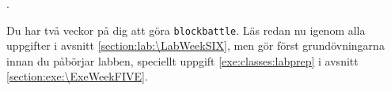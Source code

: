 

\Lab{\LabWeekFIVE}

\begin{Preparations}
\item {}.
\item Du har två veckor på dig att göra \texttt{blockbattle}. Läs redan nu igenom alla uppgifter i avsnitt \ref{section:lab:\LabWeekSIX}, men gör först  grundövningarna innan du påbörjar labben, speciellt uppgift \ref{exe:classes:labprep} i avsnitt \ref{section:exe:\ExeWeekFIVE}.
\end{Preparations}

